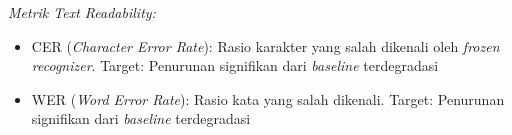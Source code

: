 \documentclass[12pt,a4paper]{article}
\begin{document}
\textit{Metrik Text Readability:}
\begin{itemize}[leftmargin=*, nosep]
\item CER (\textit{Character Error Rate}): Rasio karakter yang salah dikenali oleh \textit{frozen recognizer}. Target: Penurunan signifikan dari \textit{baseline} terdegradasi
\item WER (\textit{Word Error Rate}): Rasio kata yang salah dikenali. Target: Penurunan signifikan dari \textit{baseline} terdegradasi
\end{itemize}

\end{document}
